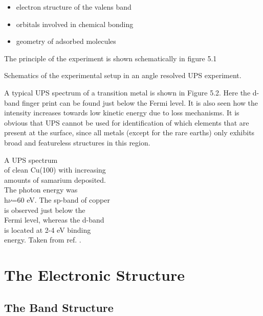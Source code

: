 \begin{itemize}
\item electron structure of the valens band
\item orbitals involved in chemical bonding
\item geometry of adsorbed molecules
\end{itemize}

The principle of the experiment is shown schematically in figure 5.1

\vspace*{11cm}

           Schematics of the experimental setup in an angle resolved UPS experiment.
 
\vspace{1cm}

A typical UPS spectrum of a transition metal is shown in Figure 5.2. Here the d-band finger print can be found just below the Fermi level. It is also seen how the intensity increases towards low kinetic energy due to loss mechanisms. It is obvious that UPS cannot be used for identification of which elements that are present at the surface, since all metals (except for the rare earths) only exhibits broad and featureless structures in this region. 

\vspace*{8cm}

           A UPS spectrum\\ of clean  Cu(100) with increasing\\ amounts of samarium deposited.\\ The photon energy was\\ h$\nu$=60 eV. The  sp-band of copper\\  is observed just  below the\\ Fermi level, whereas the  d-band\\ is located at 2-4 eV binding\\ energy. Taken from ref. \cite{Andersen}.
 
\vspace{1cm}

\section{The Electronic Structure}


\subsection{The Band Structure}

